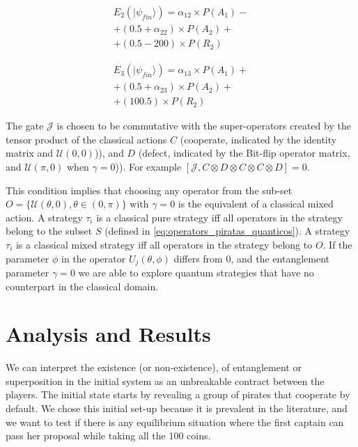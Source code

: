 \documentclass[10pt,twocolumn]{llncs}
\begin{document}
\begin{equation}
\begin{split}
E_{2}(\vert\psi_{fin}\rangle)=\alpha_{12}\times P(A_{1}) - \\
 + (0.5 + \alpha_{22})\times P(A_{2})  + \\ 
+(0.5-200)\times P(R_{2})
\end{split}
\label{eq:pirates_payoff32:2}
\end{equation}

\begin{equation}
\begin{split}
E_{3}(\vert\psi_{fin}\rangle)=\alpha_{13}\times P(A_{1}) + \\
 + (0.5 + \alpha_{23})\times P(A_{2})   + \\
 + (100.5)\times P(R_{2}) 
\end{split}
\label{eq:pirates_payoff32:3}
\end{equation}



The gate $\mathcal{J}$ is chosen to be commutative with the super-operators created by the tensor product of the classical actions $C$ (cooperate, indicated by the identity matrix and $\mathcal{U}(0,0)$)), and $D$ (defect, indicated by the Bit-flip operator matrix, and $\mathcal{U}(\pi,0)$ when $\gamma = 0$)). For example $[ \mathcal{J} , C \otimes D \otimes C \otimes C \otimes D ] = 0 $.


This condition implies that choosing any operator from the sub-set $O = \{ \mathcal{U} ( \theta , 0) , \theta \in (0, \pi) \}$ with $\gamma = 0$ is the equivalent of a classical mixed action. A strategy $\tau_{i}$ is a classical pure strategy iff all operators in the strategy belong to the subset $S$ (defined in \ref{eq:operators_piratas_quanticos}). A strategy $\tau_{i}$ is a classical mixed strategy iff all operators in the strategy belong to $O$.
If the parameter $\phi$ in the operator $U_{j}(\theta ,\phi)$ differs from $0$, and the entanglement parameter $\gamma = 0$ we are able to explore quantum strategies that have no counterpart in the classical domain\cite{Eisert2008}.









\section{Analysis and Results}
We can interpret the existence (or non-existence), of entanglement or superposition in the initial system as an unbreakable contract between the players\cite{Piotrowski}. The initial state starts by revealing a group of pirates that cooperate by default. We chose this initial set-up because it is prevalent in the literature\cite{Eisert2008}\cite{Fra2011a}\cite{Fra2011}\cite{Letters2002}, and we want to test if there is any equilibrium situation where the first captain can pass her proposal while taking all the 100 coins.
\end{document}

